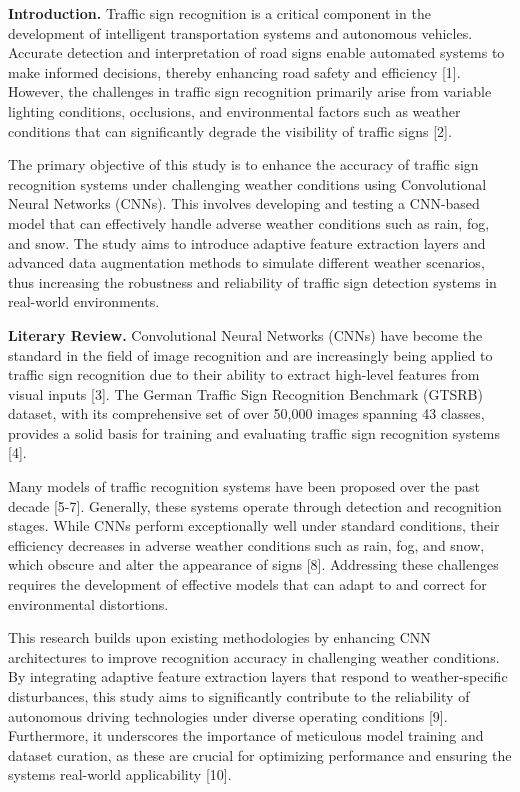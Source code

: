 \begin{multicols}{2}
{\bfseries Introduction.} Traffic sign recognition is a critical component
in the development of intelligent transportation systems and autonomous
vehicles. Accurate detection and interpretation of road signs enable
automated systems to make informed decisions, thereby enhancing road
safety and efficiency {[}1{]}. However, the challenges in traffic sign
recognition primarily arise from variable lighting conditions,
occlusions, and environmental factors such as weather conditions that
can significantly degrade the visibility of traffic signs {[}2{]}.

The primary objective of this study is to enhance the accuracy of
traffic sign recognition systems under challenging weather conditions
using Convolutional Neural Networks (CNNs). This involves developing and
testing a CNN-based model that can effectively handle adverse weather
conditions such as rain, fog, and snow. The study aims to introduce
adaptive feature extraction layers and advanced data augmentation
methods to simulate different weather scenarios, thus increasing the
robustness and reliability of traffic sign detection systems in
real-world environments.

{\bfseries Literary Review.} Convolutional Neural Networks (CNNs) have
become the standard in the field of image recognition and are
increasingly being applied to traffic sign recognition due to their
ability to extract high-level features from visual inputs {[}3{]}. The
German Traffic Sign Recognition Benchmark (GTSRB) dataset, with its
comprehensive set of over 50,000 images spanning 43 classes, provides a
solid basis for training and evaluating traffic sign recognition systems
{[}4{]}.

Many models of traffic recognition systems have been proposed over the
past decade {[}5-7{]}. Generally, these systems operate through
detection and recognition stages. While CNNs perform exceptionally well
under standard conditions, their efficiency decreases in adverse weather
conditions such as rain, fog, and snow, which obscure and alter the
appearance of signs {[}8{]}. Addressing these challenges requires the
development of effective models that can adapt to and correct for
environmental distortions.

This research builds upon existing methodologies by enhancing CNN
architectures to improve recognition accuracy in challenging weather
conditions. By integrating adaptive feature extraction layers that
respond to weather-specific disturbances, this study aims to
significantly contribute to the reliability of autonomous driving
technologies under diverse operating conditions {[}9{]}. Furthermore, it
underscores the importance of meticulous model training and dataset
curation, as these are crucial for optimizing performance and ensuring
the system\textquotesingle s real-world applicability {[}10{]}.


\end{multicols}
